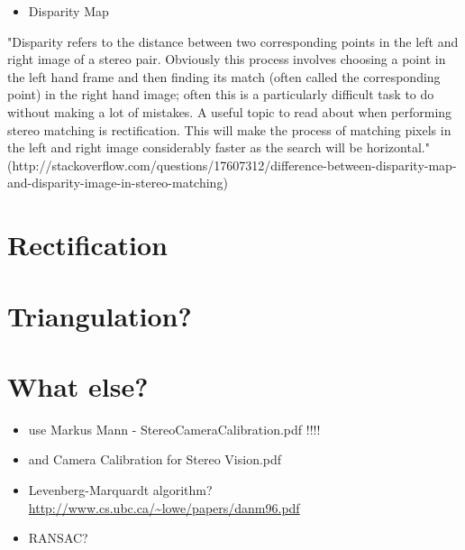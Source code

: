 \begin{itemize}
\item Disparity Map
\end{itemize}

"Disparity refers to the distance between two corresponding points in the left and right image of a stereo pair. Obviously this process involves choosing a point in the left hand frame and then finding its match (often called the corresponding point) in the right hand image; often this is a particularly difficult task to do without making a lot of mistakes. A useful topic to read about when performing stereo matching is rectification. This will make the process of matching pixels in the left and right image considerably faster as the search will be horizontal."
(http://stackoverflow.com/questions/17607312/difference-between-disparity-map-and-disparity-image-in-stereo-matching)

\section{Rectification}
\section{Triangulation?}

\section{What else?}
\begin{itemize}
\item use Markus Mann - StereoCameraCalibration.pdf !!!!
\item and Camera Calibration for Stereo Vision.pdf
\item Levenberg-Marquardt algorithm? \url{http://www.cs.ubc.ca/~lowe/papers/danm96.pdf}
\item RANSAC?
\end{itemize}
